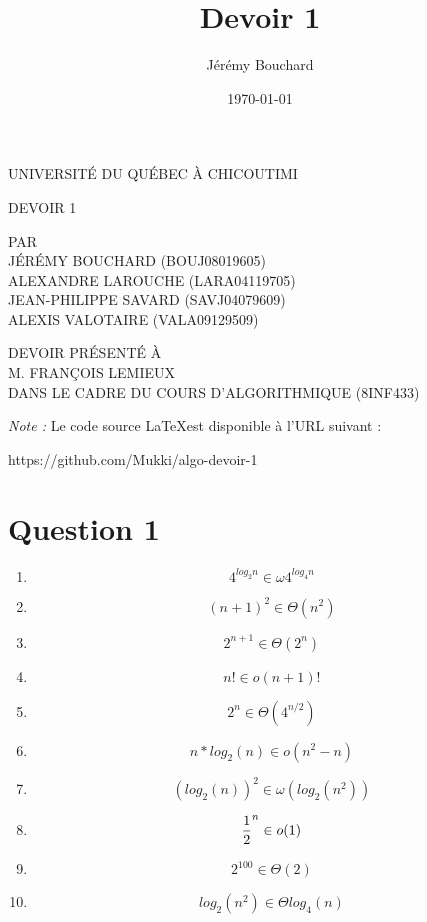 \documentclass[12pt]{article}
\title{Devoir 1}
\author{Jérémy Bouchard}
\date{\today}
\begin{document}
  \begin{titlepage}
    \doublespacing
    \centering

    UNIVERSITÉ DU QUÉBEC À CHICOUTIMI \\

    \vspace{4.7cm}

    DEVOIR 1 \\

    \vspace{4.7cm}

    PAR \\
    JÉRÉMY BOUCHARD (BOUJ08019605) \\
    ALEXANDRE LAROUCHE (LARA04119705) \\
    JEAN-PHILIPPE SAVARD (SAVJ04079609) \\
    ALEXIS VALOTAIRE (VALA09129509) \\

    \vspace{4.7cm}

    DEVOIR PRÉSENTÉ À \\
    M. FRANÇOIS LEMIEUX \\
    DANS LE CADRE DU COURS D'ALGORITHMIQUE (8INF433)

  \end{titlepage}

  \newpage

  \noindent \textit{Note :} Le code source \LaTeX \:est disponible à l'URL
  suivant :

  https://github.com/Mukki/algo-devoir-1

  \newpage

  \onehalfspacing

  \section*{Question 1}

    \begin{enumerate}[label=(\alph*)]
      \item \[ 4 ^ {log_2 n} \in \omega 4 ^ {log_4 n} \]
      \item \[ (n + 1) ^ {2} \in \Theta (n ^ 2) \]
      \item \[ 2 ^ {n + 1} \in \Theta (2 ^ n) \]
      \item \[ n! \in o (n + 1)! \]
      \item \[ 2 ^ n \in \Theta (4 ^ {n / 2}) \]
      \item \[ n*log_2(n) \in o (n ^ 2 - n) \]
      \item \[ (log_2(n)) ^ 2 \in \omega (log_2(n^2)) \]
      \item \[ {1 \over 2} ^ {n} \in o (1) \]
      \item \[ 2^{100} \in \Theta(2) \]
      \item \[ log_2(n^2) \in \Theta log_4(n) \]
    \end{enumerate}
\end{document}
